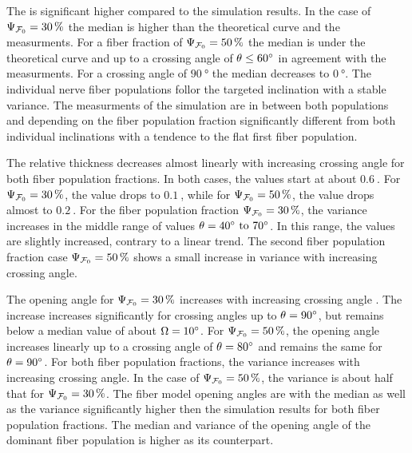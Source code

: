 The \bvariance{} is significant higher compared to the simulation results.
In the case of $\textnormal{$\Psi_{\textnormal{$\mathcal{F}_0$}}$}=\SI{30}{\percent}$ the median is higher than the theoretical curve and the measurments.
For a fiber fraction of $\textnormal{$\Psi_{\textnormal{$\mathcal{F}_0$}}$}=\SI{50}{\percent}$ the median is under the theoretical curve and up to a crossing angle of $\textnormal{$\theta$} \leq \SI{60}{\degree}$ in agreement with the measurments.
For a crossing angle of $\SI{90}{\degree}$ the median decreases to $\SI{0}{\degree}$.
The individual nerve fiber populations follor the targeted inclination with a stable \bvariance{} variance.
The measurments of the simulation are in between both populations and depending on the fiber population fraction \modelPsi{} significantly different from both individual inclinations with a tendence to the flat first fiber population.
\par
The relative thickness \trel{} decreases almost linearly with increasing crossing angle \modelOmega{} for both fiber population fractions.
In both cases, the \trel{} values start at about $\SI{0.6}{}$.
For $\textnormal{$\Psi_{\textnormal{$\mathcal{F}_0$}}$} = \SI{30}{\percent}$, the \trel{} value drops to $\SI{0.1}{}$, while for $\textnormal{$\Psi_{\textnormal{$\mathcal{F}_0$}}$} = \SI{50}{\percent}$, the \trel{} value drops almost to $\SI{0.2}{}$.
For the fiber population fraction $\textnormal{$\Psi_{\textnormal{$\mathcal{F}_0$}}$} = \SI{30}{\percent}$, the variance increases in the middle range of values $\modelOmega=\SIrange{40}{70}{\degree}$.
In this range, the \trel{} values are slightly increased, contrary to a linear trend.
The second fiber population fraction case $\textnormal{$\Psi_{\textnormal{$\mathcal{F}_0$}}$} = \SI{50}{\percent}$ shows a small increase in variance with increasing crossing angle.
\par
The opening angle \openingAngle{} for $\textnormal{$\Psi_{\textnormal{$\mathcal{F}_0$}}$}=\SI{30}{\percent}$ increases with increasing crossing angle \modelOmega{}.
The increase increases significantly for crossing angles up to $\textnormal{$\theta$}=\SI{90}{\degree}$, but remains below a median value of about $\textnormal{$\Omega$}=\SI{10}{\degree}$.
For $\textnormal{$\Psi_{\textnormal{$\mathcal{F}_0$}}$}=\SI{50}{\percent}$, the opening angle increases linearly up to a crossing angle of $\textnormal{$\theta$}=\SI{80}{\degree}$ and remains the same for $\textnormal{$\theta$}=\SI{90}{\degree}$.
For both fiber population fractions, the variance increases with increasing crossing angle.
In the case of $\textnormal{$\Psi_{\textnormal{$\mathcal{F}_0$}}$}=\SI{50}{\percent}$, the variance is about half that for $\textnormal{$\Psi_{\textnormal{$\mathcal{F}_0$}}$}=\SI{30}{\percent}$.
The fiber model opening angles are with the median as well as the \bvariance{} variance significantly higher then the simulation results for both fiber population fractions.
The median and \bvariance{} variance of the opening angle of the dominant fiber population is higher as its counterpart.
%
% 
% 
